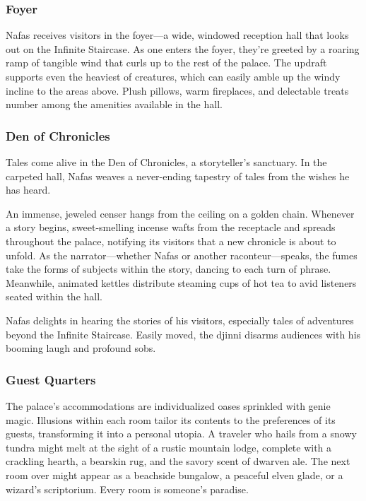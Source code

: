 \documentclass[10pt,a4paper,twoside,bg=print,twocolumn,openany,nodeprecatedcode]{dndbook}
\begin{document}
\subsubsection{Foyer}
Nafas receives visitors in the foyer—a wide, windowed reception hall that looks out on the Infinite Staircase. As one enters the foyer, they're greeted by a roaring ramp of tangible wind that curls up to the rest of the palace. The updraft supports even the heaviest of creatures, which can easily amble up the windy incline to the areas above. Plush pillows, warm fireplaces, and delectable treats number among the amenities available in the hall.

\subsubsection{Den of Chronicles}
Tales come alive in the Den of Chronicles, a storyteller's sanctuary. In the carpeted hall, Nafas weaves a never-ending tapestry of tales from the wishes he has heard.

An immense, jeweled censer hangs from the ceiling on a golden chain. Whenever a story begins, sweet-smelling incense wafts from the receptacle and spreads throughout the palace, notifying its visitors that a new chronicle is about to unfold. As the narrator—whether Nafas or another raconteur—speaks, the fumes take the forms of subjects within the story, dancing to each turn of phrase. Meanwhile, animated kettles distribute steaming cups of hot tea to avid listeners seated within the hall.

Nafas delights in hearing the stories of his visitors, especially tales of adventures beyond the Infinite Staircase. Easily moved, the djinni disarms audiences with his booming laugh and profound sobs.

\subsubsection{Guest Quarters}
The palace's accommodations are individualized oases sprinkled with genie magic. Illusions within each room tailor its contents to the preferences of its guests, transforming it into a personal utopia. A traveler who hails from a snowy tundra might melt at the sight of a rustic mountain lodge, complete with a crackling hearth, a bearskin rug, and the savory scent of dwarven ale. The next room over might appear as a beachside bungalow, a peaceful elven glade, or a wizard's scriptorium. Every room is someone's paradise.
\end{document}
